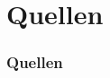 \section{Quellen}

\frame
{
  \frametitle{Quellen}

\tiny\begin{thebibliography}{5}



\end{thebibliography}
}